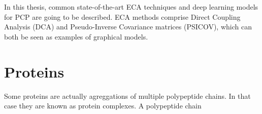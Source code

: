     In this thesis, common state-of-the-art ECA techniques and deep learning models for PCP are going to be described.
    ECA methods comprise Direct Coupling Analysis (DCA) and Pseudo-Inverse Covariance matrices (PSICOV), which can
    both be seen as examples of graphical models. 




    \section{Proteins}

    	Some proteins are actually agreggations of multiple polypeptide chains.
	In that case they are known as protein complexes. A polypeptide chain 
